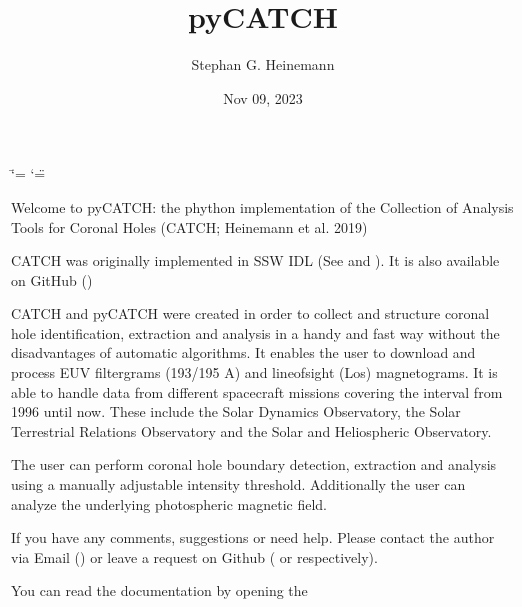 \documentclass[letterpaper,10pt,english]{sphinxmanual}
\title{pyCATCH}
\date{Nov 09, 2023}
\author{Stephan G.\@{} Heinemann}
\begin{document}
\ifdefined\shorthandoff
  \ifnum\catcode`\=\string=\active\shorthandoff{=}\fi
  \ifnum\catcode`\"=\active{}\fi
\fi

\pagestyle{empty}
\sphinxmaketitle
\pagestyle{plain}
\sphinxtableofcontents
\pagestyle{normal}
\label{\detokenize{index::doc}}


\noindent{}

\sphinxAtStartPar
Welcome to pyCATCH: the phython implementation of the Collection of Analysis Tools for Coronal Holes (CATCH; Heinemann et al. 2019)

\sphinxAtStartPar
CATCH was originally implemented in SSW IDL (See  and ).
It is also available on GitHub ()

\sphinxAtStartPar
CATCH and pyCATCH were created in order to collect and structure coronal hole identification, extraction and analysis in a handy and fast way without the disadvantages of automatic algorithms. It enables the user to download and process EUV filtergrams (193/195 A) and line\sphinxhyphen{}of\sphinxhyphen{}sight (Los) magnetograms. It is able to handle data from different spacecraft missions covering the interval from 1996 until now. These include the Solar Dynamics Observatory, the Solar Terrestrial Relations Observatory and the Solar and Heliospheric Observatory.

\sphinxAtStartPar
The user can perform coronal hole boundary detection, extraction and analysis using a manually adjustable intensity threshold. Additionally the user can analyze the underlying photospheric magnetic field.

\sphinxAtStartPar
If you have any comments, suggestions or need help. Please contact the author via E\sphinxhyphen{}mail () or leave a request on Github ( or  respectively).

\sphinxAtStartPar
You can read the documentation by opening the

\begin{sphinxVerbatim}[commandchars=\\\{\}]
\end{sphinxVerbatim}
\end{document}
